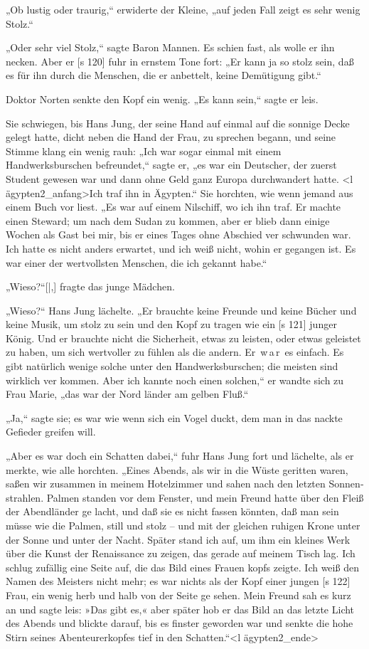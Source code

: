 „Ob lustig oder traurig,“ erwiderte der Kleine,
„auf jeden Fall zeigt es sehr wenig Stolz.“

„Oder sehr viel Stolz,“ sagte Baron Mannen.
Es schien fast, als wolle er ihn necken. Aber er
[s 120]
fuhr in ernstem Tone fort: „Er kann ja so stolz
sein, daß es für ihn durch die Menschen, die er
anbettelt, keine Demütigung gibt.“

Doktor Norten senkte den Kopf ein wenig.
„Es kann sein,“ sagte er leis.

Sie schwiegen, bis Hans Jung, der seine Hand
auf einmal auf die sonnige Decke gelegt hatte, dicht
neben die Hand der Frau, zu sprechen begann, und
seine Stimme klang ein wenig rauh: „Ich war sogar
einmal mit einem Handwerksburschen befreundet,“
sagte er, „es war ein Deutscher, der zuerst Student
gewesen war und dann ohne Geld ganz Europa
durchwandert hatte. <l ägypten2_anfang>Ich traf ihn in Ägypten.“ Sie
horchten, wie wenn jemand aus einem Buch vor­
liest. „Es war auf einem Nilschiff, wo ich ihn traf.
Er machte einen Steward; um nach dem Sudan zu
kommen, aber er blieb dann einige Wochen als Gast
bei mir, bis er eines Tages ohne Abschied ver­
schwunden war. Ich hatte es nicht anders erwartet,
und ich weiß nicht, wohin er gegangen ist. Es war
einer der wertvollsten Menschen, die ich gekannt
habe.“

„Wieso?“[|,] fragte das junge Mädchen.

„Wieso?“ Hans Jung lächelte. „Er brauchte
keine Freunde und keine Bücher und keine Musik,
um stolz zu sein und den Kopf zu tragen wie ein
[s 121]
junger König. Und er brauchte nicht die Sicherheit,
etwas zu leisten, oder etwas geleistet zu haben, um
sich wertvoller zu fühlen als die andern. Er  w a r 
es einfach. Es gibt natürlich wenige solche unter den
Handwerksburschen; die meisten sind wirklich ver­
kommen. Aber ich kannte noch einen solchen,“ er
wandte sich zu Frau Marie, „das war der Nord­
länder am gelben Fluß.“

„Ja,“ sagte sie; es war wie wenn sich ein Vogel
duckt, dem man in das nackte Gefieder greifen will.

„Aber es war doch ein Schatten dabei,“ fuhr
Hans Jung fort und lächelte, als er merkte, wie
alle horchten. „Eines Abends, als wir in die Wüste
geritten waren, saßen wir zusammen in meinem
Hotelzimmer und sahen nach den letzten Sonnen­
strahlen. Palmen standen vor dem Fenster, und mein
Freund hatte über den Fleiß der Abendländer ge­
lacht, und daß sie es nicht fassen könnten, daß man
sein müsse wie die Palmen, still und stolz – und
mit der gleichen ruhigen Krone unter der Sonne und
unter der Nacht. Später stand ich auf, um ihm ein
kleines Werk über die Kunst der Renaissance zu
zeigen, das gerade auf meinem Tisch lag. Ich schlug
zufällig eine Seite auf, die das Bild eines Frauen­
kopfs zeigte. Ich weiß den Namen des Meisters
nicht mehr; es war nichts als der Kopf einer jungen
[s 122]
Frau, ein wenig herb und halb von der Seite ge­
sehen. Mein Freund sah es kurz an und sagte leis:
»Das gibt es,« aber später hob er das Bild an das
letzte Licht des Abends und blickte darauf, bis es
finster geworden war und senkte die hohe Stirn
seines Abenteurerkopfes tief in den Schatten.“<l ägypten2_ende>

